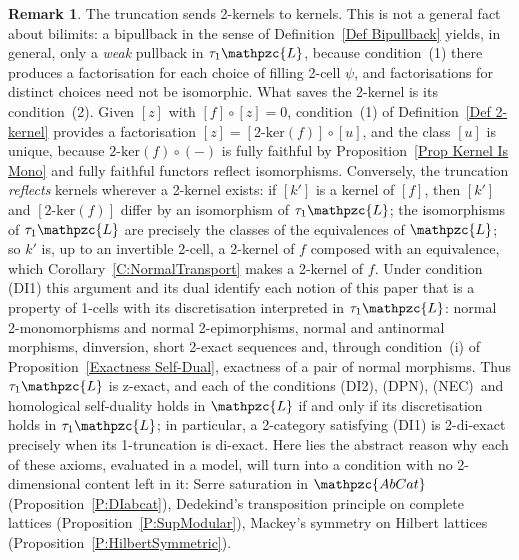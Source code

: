 \documentclass[reqno,a4paper]{amsart}
\numberwithin{equation}{section}
\theoremstyle{plain}
\theoremstyle{definition}
\newtheorem{remark}[subsection]{Remark}
\def\nameit#1{\textrm{#1}~}
\def\prox{\nameit{Proposition}}
\def\corx{\nameit{Corollary}}
\def\defx{\nameit{Definition}}
\newcommand{\comp}{\circ}
\newcommand{\catfont}[1]{\ensuremath{\mathpzc{#1}}\xspace}
\def\L{\catfont{L}}
\newcommand{\AbCat}{\catfont{AbCat}}
\renewcommand{\1}{\onecat{1}}
\newcommand{\trunc}{\ensuremath{\tau_{1}}}
\newcommand{\DPN}{\textup{(DPN)}}
\newcommand{\NEC}{\textup{(NEC)}}
\newcommand{\twoker}{\ensuremath{2\text{-}\mathrm{ker}}}
\begin{document}
\begin{remark}
	The truncation sends 2-kernels to kernels. This is not a general fact about bilimits: a bipullback in the sense of \defx\ref{Def Bipullback} yields, in general, only a \emph{weak} pullback in \(\trunc\L\), because condition~(1) there produces a factorisation for each choice of filling 2-cell \(\psi\), and factorisations for distinct choices need not be isomorphic. What saves the 2-kernel is its condition~(2). Given \([z]\) with \([f]\comp[z]=0\), condition~(1) of \defx\ref{Def 2-kernel} provides a factorisation \([z]=[\twoker(f)]\comp[u]\), and the class \([u]\) is unique, because \(\twoker(f)\comp(-)\) is fully faithful by \prox\ref{Prop Kernel Is Mono} and fully faithful functors reflect isomorphisms. Conversely, the truncation \emph{reflects} kernels wherever a 2-kernel exists: if \([k']\) is a kernel of \([f]\), then \([k']\) and \([\twoker(f)]\) differ by an isomorphism of \(\trunc\L\); the isomorphisms of \(\trunc\L\) are precisely the classes of the equivalences of \(\L\); so \(k'\) is, up to an invertible 2-cell, a 2-kernel of \(f\) composed with an equivalence, which \corx\ref{C:NormalTransport} makes a 2-kernel of \(f\). Under condition \textup{(DI1)} this argument and its dual identify each notion of this paper that is a property of 1-cells with its discretisation interpreted in \(\trunc\L\): normal 2-monomorphisms and normal 2-epimorphisms, normal and antinormal morphisms, dinversion, short 2-exact sequences and, through condition~(i) of \prox\ref{Exactness Self-Dual}, exactness of a pair of normal morphisms. Thus \(\trunc\L\) is z-exact, and each of the conditions \textup{(DI2)}, \DPN, \NEC\ and homological self-duality holds in \(\L\) if and only if its discretisation holds in \(\trunc\L\); in particular, a 2-category satisfying \textup{(DI1)} is 2-di-exact precisely when its 1-truncation is di-exact. Here lies the abstract reason why each of these axioms, evaluated in a model, will turn into a condition with no 2-dimensional content left in it: Serre saturation in \(\AbCat\) (\prox\ref{P:DIabcat}), Dedekind's transposition principle on complete lattices (\prox\ref{P:SupModular}), Mackey's symmetry on Hilbert lattices (\prox\ref{P:HilbertSymmetric}).


\end{remark}
\end{document}
